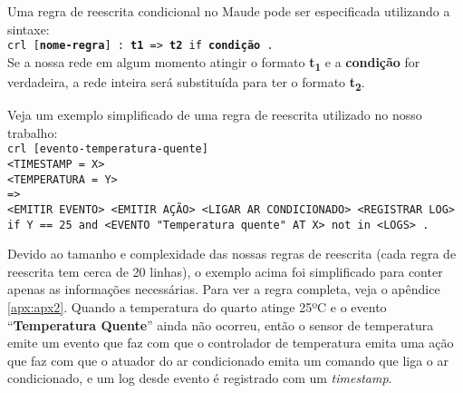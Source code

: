 Uma regra de reescrita condicional no Maude pode ser especificada utilizando a sintaxe: \\
\texttt{crl [\textbf{nome-regra}] : \textbf{t1} => \textbf{t2} if \textbf{condição} . } \\
Se a nossa rede em algum momento atingir o formato \textbf{t\textsubscript{1}} e a \textbf{condição} for verdadeira, a rede inteira será substituída para ter o formato  \textbf{t\textsubscript{2}}.

Veja um exemplo simplificado de uma regra de reescrita utilizado no nosso trabalho: \\
\texttt{crl [evento-temperatura-quente]} \\
\texttt{<TIMESTAMP = X>} \\
\texttt{<TEMPERATURA = Y>} \\
\texttt{=>} \\
\texttt{<EMITIR EVENTO> <EMITIR AÇÃO> <LIGAR AR CONDICIONADO> <REGISTRAR LOG>} \\
\texttt{if Y == 25 and <EVENTO "Temperatura quente"\ AT X> not in <LOGS> .}

Devido ao tamanho e complexidade das nossas regras de reescrita (cada regra de reescrita tem cerca de 20 linhas), o exemplo acima foi simplificado para conter apenas as informações necessárias. Para ver a regra completa, veja o apêndice \ref{apx:apx2}. Quando a temperatura do quarto atinge 25ºC e o evento ``\textbf{Temperatura Quente}'' ainda não ocorreu, então o sensor de temperatura emite um evento que faz com que o controlador de temperatura emita uma ação que faz com que o atuador do ar condicionado emita um comando que liga o ar condicionado, e um log desde evento é registrado com um \textit{timestamp}.
